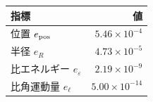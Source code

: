 \begin{tabular}{lr}\toprule
指標 & 値 \\
\midrule
位置 $e_{\rm pos}$ & $5.46\times 10^{-4}$ \\
半径 $e_R$ & $4.73\times 10^{-5}$ \\
比エネルギー $e_\varepsilon$ & $2.19\times 10^{-9}$ \\
比角運動量 $e_\ell$ & $5.00\times 10^{-14}$ \\
\bottomrule\end{tabular}
